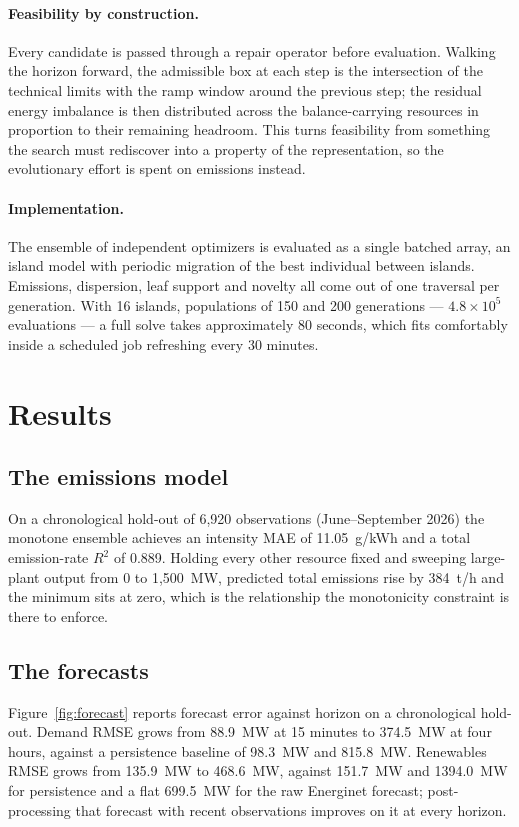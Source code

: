 \documentclass[11pt]{article}
\begin{document}
\paragraph{Feasibility by construction.}
Every candidate is passed through a repair operator before evaluation.
Walking the horizon forward, the admissible box at each step is the
intersection of the technical limits with the ramp window around the
previous step; the residual energy imbalance is then distributed across
the balance-carrying resources in proportion to their remaining headroom.
This turns feasibility from something the search must rediscover into a
property of the representation, so the evolutionary effort is spent on
emissions instead.

\paragraph{Implementation.}
The ensemble of independent optimizers is evaluated as a single batched
array, an island model with periodic migration of the best individual
between islands. Emissions, dispersion, leaf support and novelty all come
out of one traversal per generation. With 16 islands, populations of 150
and 200 generations --- $4.8\times10^{5}$ evaluations --- a full solve
takes approximately 80 seconds, which fits comfortably inside a scheduled
job refreshing every 30 minutes.

\section{Results}

\subsection{The emissions model}

On a chronological hold-out of 6{,}920 observations (June--September 2026)
the monotone ensemble achieves an intensity MAE of 11.05~g/kWh and a total
emission-rate $R^2$ of 0.889. Holding every other resource fixed and
sweeping large-plant output from 0 to 1{,}500~MW, predicted total
emissions rise by 384~t/h and the minimum sits at zero, which is the
relationship the monotonicity constraint is there to enforce.

\subsection{The forecasts}

Figure~\ref{fig:forecast} reports forecast error against horizon on a
chronological hold-out. Demand RMSE grows from 88.9~MW at 15 minutes to
374.5~MW at four hours, against a persistence baseline of 98.3~MW and
815.8~MW. Renewables RMSE grows from 135.9~MW to 468.6~MW, against
151.7~MW and 1394.0~MW for persistence and a flat 699.5~MW for the raw
Energinet forecast; post-processing that forecast with recent observations
improves on it at every horizon.
\end{document}
